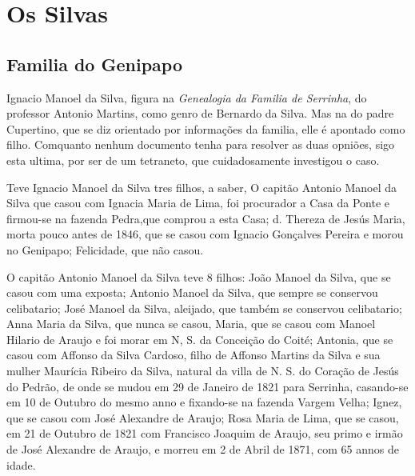 \chapter{Os Silvas}
\begin{centering}
	\section*{Familia do Genipapo}
\end{centering}
Ignacio Manoel da Silva, figura na \textit{Genealogia da Familia de Serrinha}, do professor Antonio Martins, como genro de Bernardo da Silva. Mas na do padre Cupertino, que se diz orientado por informações da familia, elle é apontado como filho.
Comquanto nenhum documento tenha para resolver as duas opniões, sigo esta ultima, por ser de um tetraneto, que cuidadosamente investigou o caso.

Teve Ignacio Manoel da Silva tres filhos, a saber, O capitão Antonio Manoel da Silva que casou com Ignacia Maria de Lima, foi
procurador a Casa da Ponte e firmou-se na fazenda Pedra,que comprou a esta Casa; d. Thereza de Jesús Maria, morta pouco antes de 1846, que se casou com Ignacio Gonçalves Pereira e morou no Genipapo; Felicidade, que não casou.

O capitão Antonio Manoel da Silva teve 8 filhos: João Manoel da Silva, que se casou com uma exposta; Antonio Manoel da Silva, que sempre se conservou celibatario; José Manoel da Silva, aleijado, que também se conservou celibatario; Anna Maria da Silva, que nunca se casou, Maria, que se casou com Manoel Hilario de Araujo e foi morar em N, S. da Conceição do Coité; Antonia, que se casou com Affonso da Silva Cardoso, filho de Affonso Martins da Silva e sua mulher Maurícia Ribeiro da Silva, natural da villa de N. S. do Coração de Jesús do Pedrão, de onde se mudou em 29 de Janeiro de 1821 para Serrinha, casando-se em 10 de Outubro do mesmo anno e fixando-se na fazenda Vargem Velha; Ignez, que se casou com José Alexandre de Araujo; Rosa Maria de Lima, que se casou, em 21 de Outubro de 1821 com Francisco Joaquim de Araujo, seu primo e irmão de José Alexandre de Araujo, e morreu em 2 de Abril de 1871, com 65 annos de idade.

